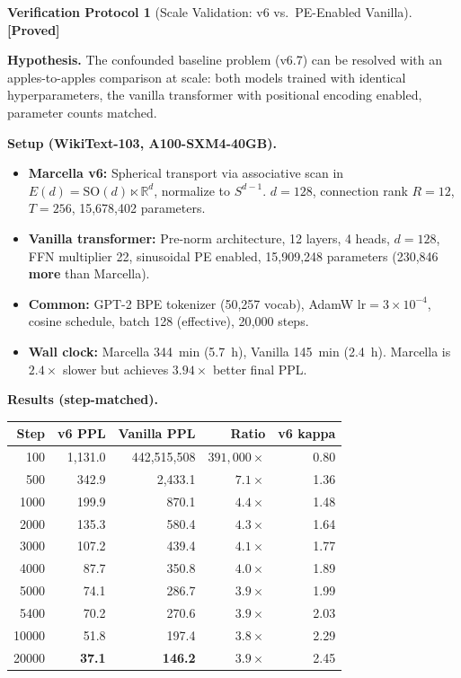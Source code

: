 \documentclass[11pt,a4paper]{article}
\theoremstyle{definition}
\newtheorem{protocol}[theorem]{Verification Protocol}
\theoremstyle{remark}
\newcommand{\SO}{\mathrm{SO}}
\newcommand{\statusproved}{\textcolor{green!50!black}{\textbf{[Proved]}}}
\begin{document}
\begin{protocol}[Scale Validation: v6 vs.\ PE-Enabled 
Vanilla]\label{prot:scale_validation}
\statusproved

\textbf{Hypothesis.} The confounded baseline problem (v6.7) can 
be resolved with an apples-to-apples comparison at scale: both 
models trained with identical hyperparameters, the vanilla 
transformer with positional encoding enabled, parameter counts 
matched.

\textbf{Setup (WikiText-103, A100-SXM4-40GB).}
\begin{itemize}[nosep]
    \item \textbf{Marcella v6:} Spherical transport via 
    associative scan in $E(d) = \SO(d) \ltimes \mathbb{R}^d$, 
    normalize to $S^{d-1}$. $d = 128$, connection rank $R = 12$, 
    $T = 256$, 15,678,402 parameters.
    \item \textbf{Vanilla transformer:} Pre-norm architecture, 
    12 layers, 4 heads, $d = 128$, FFN multiplier 22, sinusoidal 
    PE enabled, 15,909,248 parameters (230,846 \textbf{more} than Marcella).
    \item \textbf{Common:} GPT-2 BPE tokenizer (50{,}257 vocab), 
    AdamW $\mathrm{lr} = 3 \times 10^{-4}$, cosine schedule, 
    batch 128 (effective), 20{,}000 steps.
    \item \textbf{Wall clock:} Marcella 344~min (5.7~h), Vanilla 145~min (2.4~h). Marcella is $2.4\times$ slower but achieves $3.94\times$ better final PPL.
\end{itemize}

\textbf{Results (step-matched).}
\begin{center}
\begin{tabular}{rrrrr}
\toprule
\textbf{Step} & \textbf{v6 PPL} & \textbf{Vanilla PPL} 
  & \textbf{Ratio} & \textbf{v6 kappa} \\
\midrule
100   & 1{,}131.0 & 442{,}515{,}508 & $391{,}000\times$ & 0.80 \\
500   & 342.9   & 2{,}433.1       & $7.1\times$ & 1.36 \\
1000  & 199.9   & 870.1          & $4.4\times$ & 1.48 \\
2000  & 135.3   & 580.4          & $4.3\times$ & 1.64 \\
3000  & 107.2   & 439.4          & $4.1\times$ & 1.77 \\
4000  & 87.7    & 350.8          & $4.0\times$ & 1.89 \\
5000  & 74.1    & 286.7          & $3.9\times$ & 1.99 \\
5400  & 70.2    & 270.6          & $3.9\times$ & 2.03 \\
10000 & 51.8    & 197.4          & $3.8\times$ & 2.29 \\
20000 & \textbf{37.1}    & \textbf{146.2}          & $\mathbf{3.9\times}$ & 2.45 \\
\bottomrule
\end{tabular}
\end{center}


\end{protocol}
\end{document}
